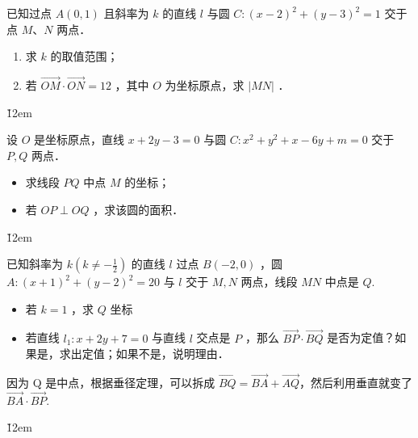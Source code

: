 \begin{example}
    已知过点 $A(0,1)$ 且斜率为 $k$ 的直线 $l$ 与圆 $C:(x-2)^2+(y-3)^2=1$ 交于点 $M$、$N$ 两点．
    \begin{enumerate}
        \item 求 $k$ 的取值范围；
        \item 若 $\overrightarrow{O M} \cdot \overrightarrow{O N}=12$ ，其中 $O$ 为坐标原点，求 $|M N|$ ．
    \end{enumerate}
\end{example}

\v{12em}

\begin{example}
    设 $O$ 是坐标原点，直线 $x+2 y-3=0$ 与圆 $C: x^2+y^2+x-6 y+m=0$ 交于 $P, Q$ 两点．
    \begin{itemize}
        \item[（1）] 求线段 $P Q$ 中点 $M$ 的坐标；
        \item[（2）] 若 $O P \perp O Q$ ，求该圆的面积．
    \end{itemize}
\end{example}

\v{12em}

\begin{example}
    已知斜率为 $k\left(k \neq-\frac{1}{2}\right)$ 的直线 $l$ 过点 $B(-2,0)$ ，圆 $A:(x+1)^2+(y-2)^2=20$ 与 $l$ 交于 $M, N$ 两点，线段 $M N$ 中点是 $Q$.
    \begin{itemize}
        \item[（1）] 若 $k=1$ ，求 $Q$ 坐标
        \item[（2）] 若直线 $l_1: x+2 y+7=0$ 与直线 $l$ 交点是 $P$ ，那么 $\overrightarrow{B P} \cdot \overrightarrow{B Q}$ 是否为定值？如果是，求出定值；如果不是，说明理由．
    \end{itemize}
\end{example}

\begin{tips}
    因为 Q 是中点，根据垂径定理，可以拆成 $\overrightarrow{BQ}= \overrightarrow{BA}+\overrightarrow{AQ}$，然后利用垂直就变了 $\overrightarrow{BA} \cdot \overrightarrow{BP}$.
\end{tips}

\v{12em}

\pagebreak

